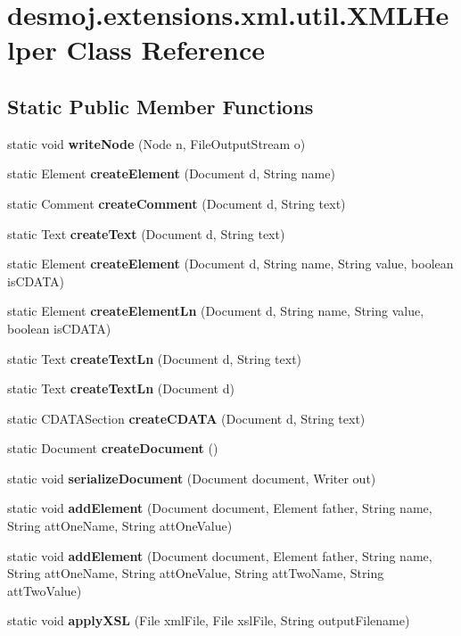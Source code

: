 \section{desmoj.\-extensions.\-xml.\-util.\-X\-M\-L\-Helper Class Reference}
\label{classdesmoj_1_1extensions_1_1xml_1_1util_1_1_x_m_l_helper}
\subsection*{Static Public Member Functions}
\begin{DoxyCompactItemize}
\item 
static void {\bf write\-Node} (Node n, File\-Output\-Stream o)
\item 
static Element {\bf create\-Element} (Document d, String name)
\item 
static Comment {\bf create\-Comment} (Document d, String text)
\item 
static Text {\bf create\-Text} (Document d, String text)
\item 
static Element {\bf create\-Element} (Document d, String name, String value, boolean is\-C\-D\-A\-T\-A)
\item 
static Element {\bf create\-Element\-Ln} (Document d, String name, String value, boolean is\-C\-D\-A\-T\-A)
\item 
static Text {\bf create\-Text\-Ln} (Document d, String text)
\item 
static Text {\bf create\-Text\-Ln} (Document d)
\item 
static C\-D\-A\-T\-A\-Section {\bf create\-C\-D\-A\-T\-A} (Document d, String text)
\item 
static Document {\bf create\-Document} ()
\item 
static void {\bf serialize\-Document} (Document document, Writer out)
\item 
static void {\bf add\-Element} (Document document, Element father, String name, String att\-One\-Name, String att\-One\-Value)
\item 
static void {\bf add\-Element} (Document document, Element father, String name, String att\-One\-Name, String att\-One\-Value, String att\-Two\-Name, String att\-Two\-Value)
\item 
static void {\bf apply\-X\-S\-L} (File xml\-File, File xsl\-File, String output\-Filename)
\end{DoxyCompactItemize}


